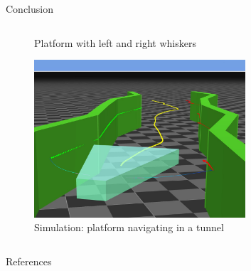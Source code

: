 \documentclass[AIRbeamer
,optEnglish
,optBiber
,optBibstyleAlphabetic
,optBeamerClassicFormat%
]{AIRlatex}
\begin{document}
\begin{frame}{Conclusion}
\begin{columns}[T,onlytextwidth]
\begin{column}[T]{0.4\textwidth}
\begin{figure}[H]
                    \caption{Platform with left and right whiskers}
                \end{figure}
                \vskip-1cm
                \begin{figure}[H]
                    \centering
                    \captionsetup{justification=centering}
                    \includegraphics[width=0.7\textwidth]{figures/platform-in-tunnel}
                    \caption{Simulation: platform navigating in a tunnel}
                \end{figure}
            \end{column}
        \end{columns}
    \end{frame}


    \begin{frame}[allowframebreaks]{References}
        \printbibliography[heading=none]
    \end{frame}%

    \AIRbeamerTitlePageStudentThesis%
\end{document}
